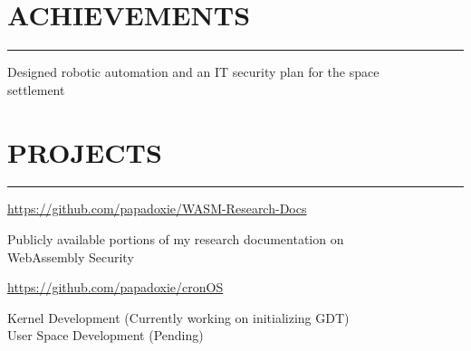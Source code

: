\documentclass[]{resume}
\begin{document}
\begin{minipage}[t]{0.66\textwidth}
    \section{ACHIEVEMENTS}
    \noindent\rule{12.80cm}{0.4pt}

     
    \vspace{4pt}
    \begin{minipage}{0.85\textwidth\vspace{4pt}}
        Designed robotic automation and an IT security plan for the space\\settlement
    \end{minipage}



    \section{PROJECTS}
    \noindent\rule{12.80cm}{0.4pt}

     
    \href{https://github.com/papadoxie/WASM-Research-Docs}{https://github.com/papadoxie/WASM-Research-Docs}\\
    \vspace{4pt}
    \begin{minipage}{0.85\textwidth\vspace{2pt}}
        Publicly available portions of my research documentation on\\
        WebAssembly Security
    \end{minipage}

    \vspace{4pt}
     
    \href{https://github.com/papadoxie/Operating-System}{https://github.com/papadoxie/cronOS}\\
    \vspace{4pt}
    \begin{minipage}{0.85\textwidth\vspace{2pt}}
        Kernel Development (Currently working on initializing GDT)\\
        User Space Development (Pending)\\
    \end{minipage}


\end{minipage}
\end{document}
